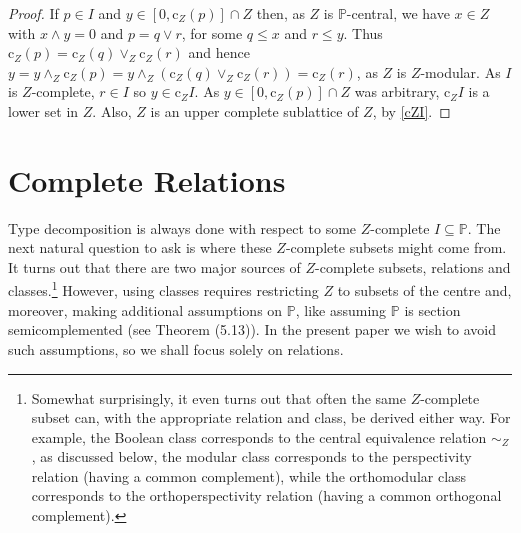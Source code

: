\documentclass{amsart}
\theoremstyle{definition}
\numberwithin{equation}{section}
\begin{document}
\begin{proof}
If $p\in I$ and $y\in[0,\mathrm{c}_Z(p)]\cap Z$ then, as $Z$ is $\mathbb{P}$-central, we have $x\in Z$ with $x\wedge y=0$ and $p=q\vee r$, for some $q\leq x$ and $r\leq y$.  Thus $\mathrm{c}_Z(p)=\mathrm{c}_Z(q)\vee_Z\mathrm{c}_Z(r)$ and hence $y=y\wedge_Z\mathrm{c}_Z(p)=y\wedge_Z(\mathrm{c}_Z(q)\vee_Z\mathrm{c}_Z(r))=\mathrm{c}_Z(r)$, as $Z$ is $Z$-modular.  As $I$ is $Z$-complete, $r\in I$ so $y\in\mathrm{c}_ZI$.  As $y\in[0,\mathrm{c}_Z(p)]\cap Z$ was arbitrary, $\mathrm{c}_ZI$ is a lower set in $Z$.  Also, $Z$ is an upper complete sublattice of $Z$, by \autoref{cZI}.
\end{proof}














 

















\section{Complete Relations}

Type decomposition is always done with respect to some $Z$-complete $I\subseteq\mathbb{P}$.  The next natural question to ask is where these $Z$-complete subsets might come from.  It turns out that there are two major sources of $Z$-complete subsets, relations and classes.\footnote{Somewhat surprisingly, it even turns out that often the same $Z$-complete subset can, with the appropriate relation and class, be derived either way.  For example, the Boolean class corresponds to the central equivalence relation $\sim_Z$, as discussed below, the modular class corresponds to the perspectivity relation (having a common complement), while the orthomodular class corresponds to the orthoperspectivity relation (having a common orthogonal complement).}  However, using classes requires restricting $Z$ to subsets of the centre and, moreover, making additional assumptions on $\mathbb{P}$, like assuming $\mathbb{P}$ is section semicomplemented (see \cite{MaedaMaeda1970} Theorem (5.13)).  In the present paper we wish to avoid such assumptions, so we shall focus solely on relations.
\end{document}
